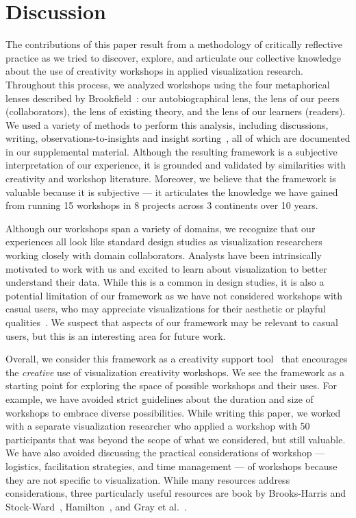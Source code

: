 \section{Discussion}
\label{sec:discussion}


The contributions of this paper result from a methodology of critically reflective practice as we tried to discover, explore, and articulate our collective knowledge about the use of creativity workshops in applied visualization research. Throughout this process, we analyzed workshops using the four metaphorical lenses described by Brookfield~\cite{Brookfield1998}: our autobiographical lens, the lens of our peers (collaborators), the lens of existing theory, and the lens of our learners (readers). We used a variety of methods to perform this analysis, including discussions, writing, observations-to-insights and insight sorting~\cite{Kumar2012}, all of which are documented in our supplemental material. Although the resulting framework is a subjective interpretation of our experience, it is grounded and validated by similarities with creativity and workshop literature. Moreover, we believe that the framework is valuable because it is subjective --- it articulates the knowledge we have gained from running 15 workshops in 8 projects across 3 continents over 10 years.

Although our workshops span a variety of domains, we recognize that our experiences all look like standard design studies as visualization researchers working closely with domain collaborators. Analysts have been intrinsically motivated to work with us and excited to learn about visualization to better understand their data. While this is a common in design studies, it is also a potential limitation of our framework as we have not considered workshops with casual users, who may appreciate visualizations for their aesthetic or playful qualities~\cite{McCurdy2016}. We suspect that aspects of our framework may be relevant to casual users, but this is an interesting area for future work.

Overall, we consider this framework as a creativity support tool~\cite{Shneiderman2005} that encourages the \emph{creative} use of visualization creativity workshops. We see the framework as a starting point for exploring the space of possible workshops and their uses. For example, we have avoided strict guidelines about the duration and size of workshops to embrace diverse possibilities. While writing this paper, we worked with a separate visualization researcher who applied a workshop with 50 participants that was  beyond the scope of what we considered, but still valuable. We have also avoided discussing the practical considerations of workshop --- logistics, facilitation strategies, and time management --- of workshops because they are not specific to visualization. While many resources address considerations, three particularly useful resources are book by Brooks-Harris and Stock-Ward~\cite{Brooks-Harris1999}, Hamilton~\cite{Hamilton2016}, and Gray et al.~\cite{Macanufo2010}.

